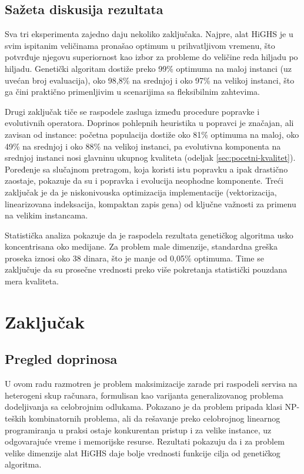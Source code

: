 \documentclass[12pt]{article}
\begin{document}
\subsection{Sažeta diskusija rezultata}

Sva tri eksperimenta zajedno daju nekoliko zaključaka. Najpre, alat HiGHS je u svim ispitanim veličinama pronašao optimum u prihvatljivom vremenu, što potvrđuje njegovu superiornost kao izbor za probleme do veličine reda hiljadu po hiljadu. Genetički algoritam dostiže preko 99\% optimuma na maloj instanci (uz uvećan broj evaluacija), oko 98,8\% na srednjoj i oko 97\% na velikoj instanci, što ga čini praktično primenljivim u scenarijima sa fleksibilnim zahtevima.

Drugi zaključak tiče se raspodele zasluga između procedure popravke i evolutivnih operatora. Doprinos pohlepnih heuristika u popravci je značajan, ali zavisan od instance: početna populacija dostiže oko 81\% optimuma na maloj, oko 49\% na srednjoj i oko 88\% na velikoj instanci, pa evolutivna komponenta na srednjoj instanci nosi glavninu ukupnog kvaliteta (odeljak \ref{sec:pocetni-kvalitet}). Poređenje sa slučajnom pretragom, koja koristi istu popravku a ipak drastično zaostaje, pokazuje da su i popravka i evolucija neophodne komponente. Treći zaključak je da je niskonivouska optimizacija implementacije (vektorizacija, linearizovana indeksacija, kompaktan zapis gena) od ključne važnosti za primenu na velikim instancama.

Statistička analiza pokazuje da je raspodela rezultata genetičkog algoritma usko koncentrisana oko medijane. Za problem male dimenzije, standardna greška proseka iznosi oko 38 dinara, što je manje od 0,05\% optimuma. Time se zaključuje da su prosečne vrednosti preko više pokretanja statistički pouzdana mera kvaliteta.

\pagebreak

\section{Zaključak}\label{sec:zakljucak}

\subsection{Pregled doprinosa}

U ovom radu razmotren je problem maksimizacije zarade pri raspodeli servisa na heterogeni skup računara, formulisan kao varijanta generalizovanog problema dodeljivanja sa celobrojnim odlukama. Pokazano je da problem pripada klasi NP-teških kombinatornih problema, ali da rešavanje preko celobrojnog linearnog programiranja u praksi ostaje konkurentan pristup i za velike instance, uz odgovarajuće vreme i memorijske resurse. Rezultati pokazuju da i za problem velike dimenzije alat HiGHS daje bolje vrednosti funkcije cilja od genetičkog algoritma.
\end{document}

